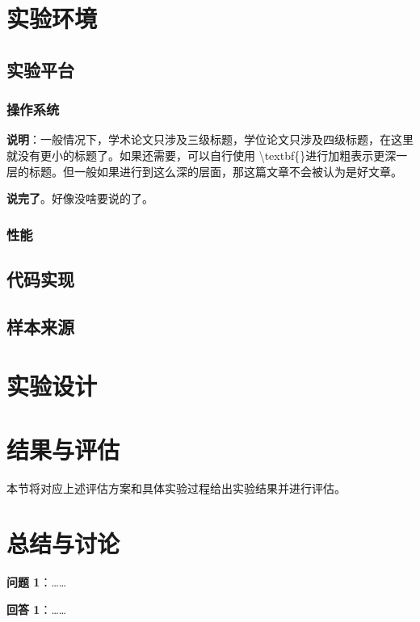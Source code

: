 \documentclass[14pt]{jnuthesis}
\begin{document}
\section{实验环境}

\subsection{实验平台} %

\subsubsection{操作系统}

\textbf{说明}：一般情况下，学术论文只涉及三级标题，学位论文只涉及四级标题，在这里就没有更小的标题了。如果还需要，可以自行使用 \textbackslash textbf\{\}进行加粗表示更深一层的标题。但一般如果进行到这么深的层面，那这篇文章不会被认为是好文章。

\textbf{说完了}。好像没啥要说的了。

\subsubsection{性能}

\subsection{代码实现}

\subsection{样本来源}

\section{实验设计}

\section{结果与评估}

本节将对应上述评估方案和具体实验过程给出实验结果并进行评估。

\section{总结与讨论} %

\textbf{问题 1}：……

\textbf{回答 1}：……
\end{document}

